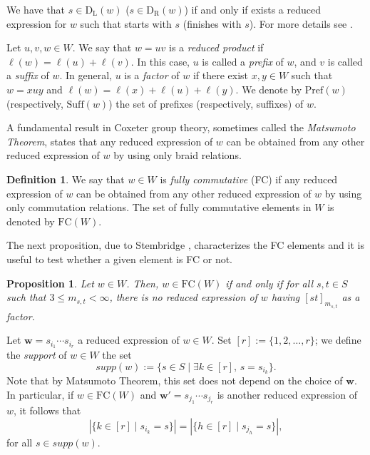 \documentclass{amsart}
\newcommand{\ld}{{\mathrm{D}_{\mathrm{L}}}}
\newcommand{\rd}{{\mathrm{D}_{\mathrm{R}}}}
\newcommand{\fc}{{\mathrm{FC}}}
\newcommand{\su}{\mathrm{Suff}}
\newcommand{\pr}{\mathrm{Pref}}
\newtheorem{Proposition}[Theorem]{Proposition}
\theoremstyle{definition}
\newtheorem{Definition}[Theorem]{Definition}
\begin{document}
We have that $s\in \ld(w)$ ($s\in \rd(w)$) if and only if exists a reduced expression for $w$ such that starts with $s$ (finishes with $s$). For more details see \cite[\S 1.4]{b07}.


Let $u, v, w \in W$. We say that $w = uv$ is a \textit{reduced product}  if $\ell(w) = \ell(u) + \ell(v)$. In this case, $u$ is called a  \textit{prefix} of $w$, and $v$ is called a \textit{suffix} of $w$. In general, $u$ is a \textit{factor} of $w$ if there exist $x, y \in W$ such that $w = xuy$ and $\ell(w) = \ell(x) + \ell(u) + \ell(y)$.
 We denote by $\pr(w)$ (respectively, $\su(w)$) the set of prefixes (respectively, suffixes)  of $w$.


A fundamental result in Coxeter group theory, sometimes called the \textit{Matsumoto Theorem}, states that any reduced expression of $w$ can be obtained from any other reduced expression of $w$ by using only braid relations. 
\begin{Definition}
\label{fcdefinition}
 We say that $w\in W$ is \textit{fully commutative} (FC) if any reduced expression of $w$ can be obtained from any other reduced expression of $w$ by using only commutation relations.
The set of fully commutative elements in $W$ is denoted by $\fc(W)$.
\end{Definition}




The next proposition, due to Stembridge \cite[Proposition 2.1]{stem}, characterizes the FC elements and it is useful to test whether a given element is FC or not.

\begin{Proposition}
\label{caratterizzazionefc}
Let $w\in W$. Then, $w\in \fc(W)$ if and only if for all $s,t\in S$ such that $3\le m_{s,t}< \infty$, there is no reduced expression of $w$ having $[st]_{m_{s,t}}$ as a factor.
\end{Proposition}

Let $\mathbf{w}=s_{i_1}\cdots s_{i_r}$ a reduced expression of $w\in W$.
Set $[r]:=\{1,2,\ldots, r\}$; we define the \textit{support} of $w\in W$ the set \[supp(w):=\{s\in S\mid \exists k\in [r]\mbox{, }s=s_{{i_k}}\}.\] 
Note that by Matsumoto Theorem, this set does not depend on the choice of $\mathbf{w}$. In particular, if $w\in\fc(W)$ and $\mathbf{w'}=s_{j_1}\cdots s_{j_r}$ is another reduced expression of $w$, it follows that
\[\left | \{k\in \left[r\right]\mid s_{i_k}=s\}\right |=\left |\{h\in \left[r\right ]\mid s_{j_h}=s\}\right |,\]
for all $s\in supp(w)$.\\
\end{document}
